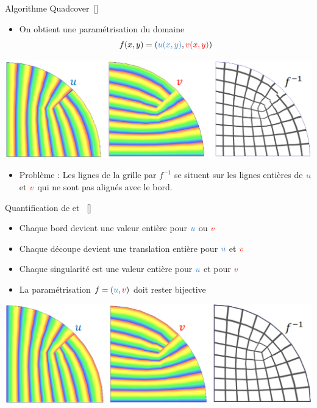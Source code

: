 \begin{frame}{Algorithme Quadcover~[\cite{kalberer_quadcover_2007}]}
    \centering
    \begin{itemize}
        \item On obtient une paramétrisation du domaine \[f(x,y) = (\blue{u(x,y)}, \red{v(x,y)})\]
    \end{itemize}
    
    \includegraphics[width=\linewidth]{img/new_images/u_v_forme_f.png}
    \vspace{-1em}
    \begin{itemize}
        \item Problème : Les lignes de la grille par $f^{-1}$ se situent sur les lignes entières de $\blue{u}$ et ${\color{red}v}$
        qui ne sont pas alignés avec le bord.
    \end{itemize}
\end{frame}

\begin{frame}{Quantification de  et ~[\cite{bommes_integer-grid_2013}]}
    \begin{itemize}
        \item Chaque bord devient une valeur entière pour $\blue{u}$ ou ${\color{red}v}$
        \item Chaque découpe devient une translation entière pour $\blue{u}$ et ${\color{red}v}$
        \item Chaque singularité est une valeur entière pour $\blue{u}$ et pour ${\color{red}v}$
		\item La paramétrisation $f = (\blue{u}, \red{v})$ doit rester bijective
    \end{itemize}
    
    \vspace{1em} %
    \centering
    \includegraphics[width=\linewidth]{img/new_images/uv_quantizee.png}
\end{frame}

